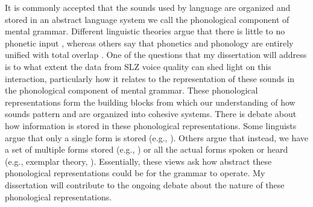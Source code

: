 \documentclass[12pt, letterpaper]{article}
\begin{document}
It is commonly accepted that the sounds used by language are organized and stored in an abstract language system we call the phonological component of mental grammar. Different linguistic theories argue that there is little to no phonetic input \citep{reissSubstanceFreePhonology2017}, whereas others say that phonetics and phonology are entirely unified with total overlap \citep{flemmingScalarCategoricalPhenomena2001}. One of the questions that my dissertation will address is to what extent the data from SLZ voice quality can shed light on this interaction, particularly how it relates to the representation of these sounds in the phonological component of mental grammar. These phonological representations form the building blocks from which our understanding of how sounds pattern and are organized into cohesive systems. There is debate about how information is stored in these phonological representations. Some linguists argue that only a single form is stored (e.g., \cite{albrightIdentificationBasesMorphological2002}). Others argue that instead, we have a set of multiple forms stored (e.g., \cite{mascaroExternalAllomorphyLexical2007}) or all the actual forms spoken or heard (e.g., exemplar theory, \cite{ernestusIntraparadigmaticEffectsPerception2007}). Essentially, these views ask how abstract these phonological representations could be for the grammar to operate. My dissertation will contribute to the ongoing debate about the nature of these phonological representations. 




\end{document}
